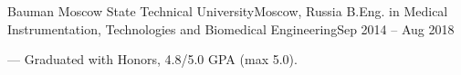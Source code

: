 \resumeSubheading
{Bauman Moscow State Technical University}{Moscow, Russia}
{B.Eng. in Medical Instrumentation, Technologies and Biomedical Engineering}{Sep 2014 -- Aug 2018}
\begin{itemize}[leftmargin=0in, label={}]
    \small{\item{
        {— Graduated with Honors, 4.8/5.0 GPA (max 5.0).}\\
    }}
\end{itemize}

